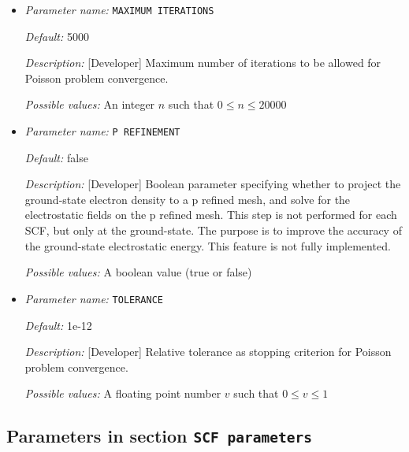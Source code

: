\begin{itemize}
\item {\it Parameter name:} {\tt MAXIMUM ITERATIONS}
\label{parameters:Poisson problem parameters/MAXIMUM ITERATIONS}
\label{parameters:Poisson_20problem_20parameters/MAXIMUM_20ITERATIONS}




{\it Default:} 5000


{\it Description:} [Developer] Maximum number of iterations to be allowed for Poisson problem convergence.


{\it Possible values:} An integer $n$ such that $0\leq n \leq 20000$
\item {\it Parameter name:} {\tt P REFINEMENT}
\label{parameters:Poisson problem parameters/P REFINEMENT}
\label{parameters:Poisson_20problem_20parameters/P_20REFINEMENT}




{\it Default:} false


{\it Description:} [Developer] Boolean parameter specifying whether to project the ground-state electron density to a p refined mesh, and solve for the electrostatic fields on the p refined mesh. This step is not performed for each SCF, but only at the ground-state. The purpose is to improve the accuracy of the ground-state electrostatic energy. This feature is not fully implemented.


{\it Possible values:} A boolean value (true or false)
\item {\it Parameter name:} {\tt TOLERANCE}
\label{parameters:Poisson problem parameters/TOLERANCE}
\label{parameters:Poisson_20problem_20parameters/TOLERANCE}




{\it Default:} 1e-12


{\it Description:} [Developer] Relative tolerance as stopping criterion for Poisson problem convergence.


{\it Possible values:} A floating point number $v$ such that $0 \leq v \leq 1$
\end{itemize}

\subsection{Parameters in section \tt SCF parameters}
\label{parameters:SCF_20parameters}

